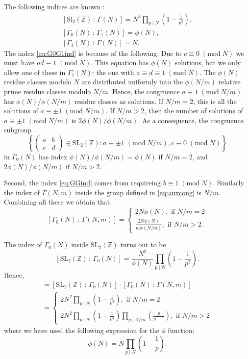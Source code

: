 \documentclass{article}
\theoremstyle{definition}
\newcommand{\ZZ} {{\mathbb Z}}		%
\begin{document}
The following indices are known \cite[Section 1.2]{diamond2005first}:
\begin{gather}
\label{eq:GGind} [\mathrm{Sl}_2(\ZZ) \, : \, \Gamma(N)] = N^3 \prod_{p \mid N}\left(1-\frac{1}{p^2} \right), \\
\label{eq:G0G1ind} [\Gamma_0(N) \, : \, \Gamma_1(N) ]= \phi(N), \\
\label{eq:GGind} [\Gamma_1(N) \, : \, \Gamma(N) ]= N.
\end{gather}
The index \eqref{eq:G0G1ind} is because of the following. Due to $c \equiv 0 \;( \mathrm{mod}\;N)$ we must have $ad\equiv 1 \;( \mathrm{mod}\;N)$. This equation has $\phi(N)$ solutions, but we only allow one of these in $\Gamma_1(N)$: the one with $a\equiv d\equiv 1 \;(\mathrm{mod}\;N)$. The $\phi(N)$ residue classes modulo $N$ are distributed uniformly into the $\phi(N/m)$ relative prime residue classes modulo $N/m$. Hence, the congruence $a \equiv 1 \;( \mathrm{mod}\;N/m)$ has $\phi(N)/\phi(N/m)$ residue classes as solutions. If $N/m=2$, this is all the solutions of $a \equiv \pm 1 \;( \mathrm{mod}\;N/m)$. If $N/m>2$, then the number of solutions of $a \equiv \pm 1 \;( \mathrm{mod}\;N/m)$ is $2\phi(N)/\phi(N/m)$. As a consequence, the congruence subgroup
\begin{equation}  \left\{ \begin{pmatrix} a & b \\ c & d \end{pmatrix} \in \mathrm{SL}_2(\ZZ): a \equiv \pm 1 \;(\mathrm{mod}\;N/m), c \equiv 0 \;(\mathrm{mod}\;N) \right\} 
\label{eq:auxcong}
\end{equation}
in $\Gamma_0(N)$ has index $\phi(N)/\phi(N/m)=\phi(N)$ if $N/m=2$, and $2\phi(N)/\phi(N/m)$ if $N/m>2$.

Second, the index \eqref{eq:GGind} comes from requireing $b \equiv 1 \;( \mathrm{mod}\;N)$. Similarly the index of $\Gamma(N,m)$ inside the group defined in \eqref{eq:auxcong} is $N/m$. Combining all these we obtain that 
\[ [\Gamma_0(N) \, : \, \Gamma(N,m) ]= \begin{cases}
2N \phi(N), \textrm{ if } N/m =2 \\
\frac{2N \phi(N)}{m \phi(N/m)}, \textrm{ if } N/m >2.
\end{cases} \]

The index of $\Gamma_0(N)$ inside $\mathrm{SL}_2(\ZZ)$ turns out to be
\[  [\mathrm{SL}_2(\ZZ) \, : \, \Gamma_0(N) ]=\frac{N^2}{\phi(N)}\prod_{p \mid N}\left(1-\frac{1}{p^2} \right). \]
Hence,
\begin{multline*} [\mathrm{SL}_2(\ZZ) \, : \, \Gamma(N,m) ] = [\mathrm{SL}_2(\ZZ) \, : \, \Gamma_0(N) ] \cdot [\Gamma_0(N) \, : \, \Gamma(N,m) ] \\
=\begin{cases} 
2N^2\prod_{p \mid N}\left(1-\frac{1}{p^2} \right),\textrm{ if } N/m =2 \\
2N^2\prod_{p \mid N}\left(1-\frac{1}{p^2} \right) \prod_{p \mid N/m }\left(\frac{p}{p-1} \right),\textrm{ if } N/m >2
\end{cases}
\end{multline*}
where we have used the following expression for the $\phi$ function:
\[ \phi(N)=N \prod_{p \mid  N}\left(1-\frac{1}{p} \right). \]
\end{document}
